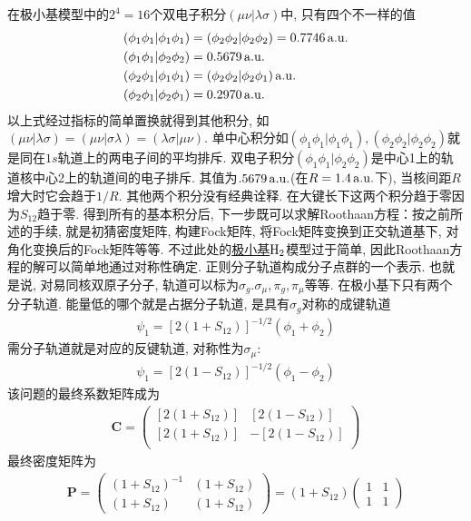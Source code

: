 在极小基模型中的$2^4=16$个双电子积分$(\mu\nu|\lambda\sigma)$中, 只有四个不一样的值
\begin{equation}
\begin{split}
(\phi_1\phi_1|\phi_1\phi_1) & = (\phi_2\phi_2|\phi_2\phi_2) = 0.7746\,\mathrm{a.u.}\\
(\phi_1\phi_1|\phi_2\phi_2) & =0.5679\,\mathrm{a.u.}\\
(\phi_2\phi_1|\phi_1\phi_1) & =(\phi_2\phi_2|\phi_2\phi_1)\,\mathrm{a.u.}\\
(\phi_2\phi_1|\phi_2\phi_1) & =0.2970\,\mathrm{a.u.}
\end{split}
\end{equation}
以上式经过指标的简单置换就得到其他积分, 如$(\mu\nu|\lambda\sigma)=(\mu\nu|\sigma\lambda)=(\lambda\sigma|\mu\nu)$. 单中心积分如$(\phi_1\phi_1|\phi_1\phi_1),(\phi_2\phi_2|\phi_2\phi_2)$就是同在$1s$轨道上的两电子间的平均排斥. 双电子积分$(\phi_1\phi_1|\phi_2\phi_2)$是中心1上的轨道核中心2上的轨道间的电子排斥. 其值为$.5679\,\mathrm{a.u.}$(在$R=1.4\,\mathrm{a.u.}$下), 当核间距$R$增大时它会趋于$1/R$. 其他两个积分没有经典诠释. 在大键长下这两个积分趋于零因为$S_{12}$趋于零. 得到所有的基本积分后, 下一步既可以求解Roothaan方程：按之前所述的手续, 就是初猜密度矩阵, 构建Fock矩阵, 将Fock矩阵变换到正交轨道基下, 对角化变换后的Fock矩阵等等. 不过此处的\underline{极小基$\mathrm{H}_2$}模型过于简单, 因此Roothaan方程的解可以简单地通过对称性确定. 正则分子轨道构成分子点群的一个表示. 也就是说, 对易同核双原子分子, 轨道可以标为$\sigma_g.\sigma_\mu,\pi_g,\pi_\mu$等等. 在极小基下只有两个分子轨道. 能量低的哪个就是占据分子轨道, 是具有$\sigma_g$对称的成键轨道
\begin{align}
\psi_1 = [2(1+S_{12})]^{-1/2}(\phi_1+\phi_2)
\end{align}
需分子轨道就是对应的反键轨道, 对称性为$\sigma_\mu$:
\begin{align}
\psi_1 = [2(1-S_{12})]^{-1/2}(\phi_1-\phi_2)
\end{align}
该问题的最终系数矩阵成为
\begin{align}
\mathbf{C}=
\begin{pmatrix}
[2(1+S_{12})]&[2(1-S_{12})]\\
[2(1+S_{12})]&-[2(1-S_{12})]\\
\end{pmatrix}
\end{align}
最终密度矩阵为
\begin{align}
\mathbf{P}=
\begin{pmatrix}
(1+S_{12})^{-1} & (1+S_{12})\\(1+S_{12})&(1+S_{12})
\end{pmatrix}
=(1+S_{12})
\begin{pmatrix}
1&1\\1&1
\end{pmatrix}
\end{align}
